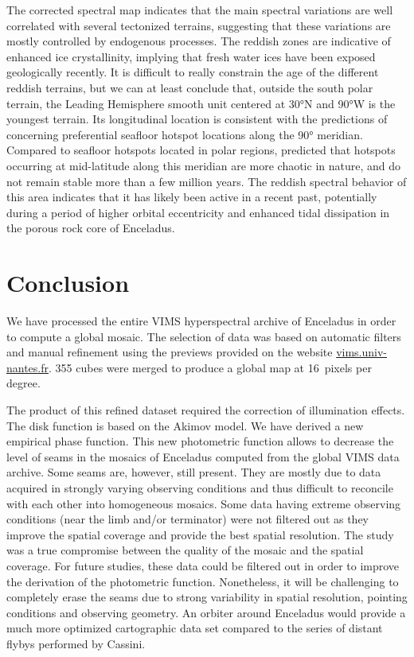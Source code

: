 \documentclass{arxiv-icarus}
\begin{document}
The corrected spectral map indicates that the main spectral variations are well correlated with several tectonized terrains, suggesting that these variations are mostly controlled by endogenous processes. The reddish zones are indicative of enhanced ice crystallinity, implying that fresh water ices have been exposed geologically recently. It is difficult to really constrain the age of the different reddish terrains, but we can at least conclude that, outside the south polar terrain, the Leading Hemisphere smooth unit centered at \ang{30}N and \ang{90}W is the youngest terrain. Its longitudinal location is consistent with the predictions of \cite{Choblet2017} concerning preferential seafloor hotspot locations along the \ang{90} meridian. Compared to seafloor hotspots located in polar regions, \cite{Choblet2017} predicted that hotspots occurring at mid-latitude along this meridian are more chaotic in nature, and do not remain stable more than a few million years. The reddish spectral behavior of this area indicates that it has likely been active in a recent past, potentially during a period of higher orbital eccentricity and enhanced tidal dissipation in the porous rock core of Enceladus.

\section{Conclusion}

We have processed the entire VIMS hyperspectral archive of Enceladus in order to compute a global mosaic. The selection of data was based on automatic filters and manual refinement using the previews provided on the website \href{https://vims.univ-nantes.fr}{vims.univ-nantes.fr}. 355 cubes were merged to produce a global map at \SI{16}{pixels} per degree.

The product of this refined dataset required the correction of illumination effects. The disk function is based on the Akimov model. We have derived a new empirical phase function. This new photometric function allows to decrease the level of seams in the mosaics of Enceladus computed from the global VIMS data archive. Some seams are, however, still present. They are mostly due to data acquired in strongly varying observing conditions and thus difficult to reconcile with each other into homogeneous mosaics. Some data having extreme observing conditions (\eg near the limb and/or terminator) were not filtered out as they improve the spatial coverage and provide the best spatial resolution. The study was a true compromise between the quality of the mosaic and the spatial coverage. For future studies, these data could be filtered out in order to improve the derivation of the photometric function. Nonetheless, it will be challenging to completely erase the seams due to strong variability in spatial resolution, pointing conditions and observing geometry. An orbiter around Enceladus would provide a much more optimized cartographic data set compared to the series of distant flybys performed by Cassini.
\end{document}
